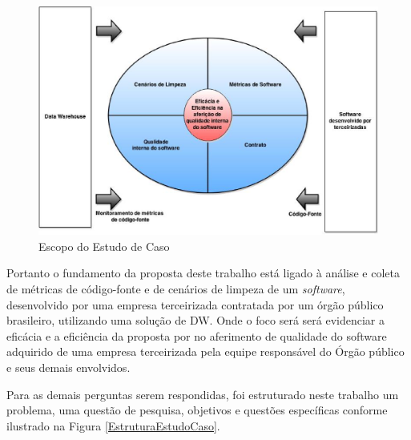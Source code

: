 \begin{figure}[h!]
\centering
\includegraphics[keepaspectratio=false,scale=0.5]{figuras/figuras_nilton/EscopoEstudoCaso.eps}
\caption{Escopo do Estudo de Caso}
\label{EscopoEstudoCaso}
\end{figure}

Portanto o fundamento da proposta deste trabalho está ligado à análise e coleta de  métricas de código-fonte e de cenários de limpeza de um \textit{software}, desenvolvido por uma empresa terceirizada contratada por um órgão público brasileiro, utilizando uma solução de DW. Onde o foco será será evidenciar a eficácia e a eficiência da proposta por  no aferimento de qualidade do software adquirido de uma empresa terceirizada pela equipe responsável do Órgão público e seus demais envolvidos.
	
Para  as demais perguntas serem respondidas, foi estruturado neste trabalho um problema, uma questão de pesquisa, objetivos e questões específicas conforme ilustrado na Figura \ref{EstruturaEstudoCaso}.

